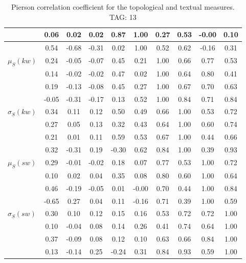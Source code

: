 \begin{table*}[h!]
\begin{center}
\begin{tabular}{| l | c | c | c | c | c | c | c | c | c |}
 & 0.06  & 0.02  & 0.02  & 0.87  & 1.00  & 0.27  & 0.53  & -0.00  & 0.10 \\\hline
 & 0.54  & -0.68  & -0.31  & 0.02  & 1.00  & 0.52  & 0.62  & -0.16  & 0.31 \\\hline
$\mu_S(kw)$ & 0.24  & -0.05  & -0.07  & 0.45  & 0.21  & 1.00  & 0.66  & 0.77  & 0.53 \\\hline
 & 0.14  & -0.02  & -0.02  & 0.47  & 0.02  & 1.00  & 0.64  & 0.80  & 0.41 \\\hline
 & 0.19  & -0.13  & -0.08  & 0.45  & 0.27  & 1.00  & 0.67  & 0.70  & 0.63 \\\hline
 & -0.05  & -0.31  & -0.17  & 0.13  & 0.52  & 1.00  & 0.84  & 0.71  & 0.84 \\\hline
$\sigma_S(kw)$ & 0.34  & 0.11  & 0.12  & 0.50  & 0.49  & 0.66  & 1.00  & 0.53  & 0.72 \\\hline
 & 0.27  & 0.05  & 0.13  & 0.32  & 0.43  & 0.64  & 1.00  & 0.60  & 0.74 \\\hline
 & 0.21  & 0.01  & 0.11  & 0.59  & 0.53  & 0.67  & 1.00  & 0.44  & 0.66 \\\hline
 & 0.32  & -0.31  & 0.19  & -0.30  & 0.62  & 0.84  & 1.00  & 0.39  & 0.93 \\\hline
$\mu_S(sw)$ & 0.29  & -0.01  & -0.02  & 0.18  & 0.07  & 0.77  & 0.53  & 1.00  & 0.72 \\\hline
 & 0.10  & 0.02  & 0.04  & 0.35  & 0.08  & 0.80  & 0.60  & 1.00  & 0.64 \\\hline
 & 0.46  & -0.19  & -0.05  & 0.01  & -0.00  & 0.70  & 0.44  & 1.00  & 0.84 \\\hline
 & -0.65  & 0.27  & 0.04  & 0.11  & -0.16  & 0.71  & 0.39  & 1.00  & 0.59 \\\hline
$\sigma_S(sw)$ & 0.30  & 0.10  & 0.12  & 0.15  & 0.16  & 0.53  & 0.72  & 0.72  & 1.00 \\\hline
 & 0.10  & -0.04  & 0.08  & 0.14  & 0.26  & 0.41  & 0.74  & 0.64  & 1.00 \\\hline
 & 0.37  & -0.09  & 0.08  & 0.12  & 0.10  & 0.63  & 0.66  & 0.84  & 1.00 \\\hline
 & 0.13  & -0.14  & 0.25  & -0.24  & 0.31  & 0.84  & 0.93  & 0.59  & 1.00 \\\hline
\end{tabular}
\caption{Pierson correlation coefficient for the topological and textual measures. TAG: 13}
\end{center}
\end{table*}